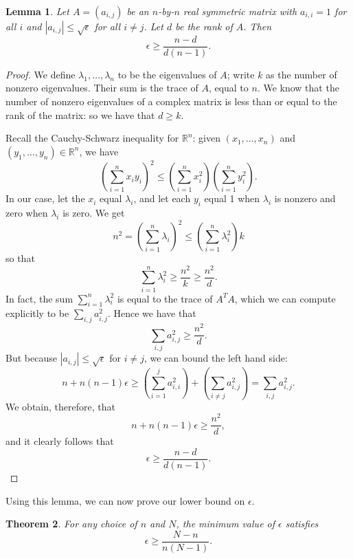 \documentclass[11pt,letterpaper,twoside,english]{article}
\theoremstyle{theorem}
\newtheorem{theorem}{Theorem}[section]
\newtheorem{lemma}[theorem]{Lemma}
\theoremstyle{remark}
\begin{document}
\begin{lemma}
Let $A=(a_{i,j})$ be an $n$-by-$n$ real symmetric matrix with $a_{i,i}=1$ for all $i$ and $|a_{i,j}|\leq \sqrt{\epsilon}$ for all $i\neq j$. Let $d$ be the rank of $A$. Then
\[\epsilon\geq \frac{n-d}{d(n-1)}.\]
\end{lemma}
\begin{proof}
We define $\lambda_1,\ldots, \lambda_n$ to be the eigenvalues of $A$; write $k$ as the number of nonzero eigenvalues. Their sum is the trace of $A$, equal to $n$. We know that the number of nonzero eigenvalues of a complex matrix is less than or equal to the rank of the matrix: so we have that $d\geq k$.

Recall the Cauchy-Schwarz inequality for $\mathbb R^n$: given $(x_1,\ldots, x_n)$ and $(y_1,\ldots, y_n)\in \mathbb R^n$, we have
\[\left(\sum_{i=1}^nx_iy_i\right)^2\leq \left(\sum_{i=1}^n x_i^2\right)\left(\sum_{i=1}^ny_i^2\right).\]
In our case, let the $x_i$ equal $\lambda_i$, and let each $y_i$ equal 1 when $\lambda_i$ is nonzero and zero when $\lambda_i$ is zero. We get
\[n^2=\left(\sum_{i=1}^n \lambda_i\right)^2\leq \left(\sum_{i=1}^n \lambda_i^2\right) k\]
so that
\[\sum_{i=1}^n \lambda_i^2\geq\frac{n^2}{k}\geq \frac{n^2}{d}.\]
In fact, the sum $\sum_{i=1}^n \lambda_i^2$ is equal to the trace of $A^TA$, which we can compute explicitly to be $\sum_{i,j}a_{i,j}^2$. Hence we have that
\[\sum_{i,j}a_{i,j}^2\geq \frac{n^2}{d}.\]
But because $|a_{i,j}|\leq \sqrt\epsilon$ for $i\neq j$, we can bound the left hand side:
\[n+n(n-1)\epsilon\geq \left(\sum_{i=1}^j a_{i,i}^2\right)+\left(\sum_{i\neq j}a_{i,j}^2\right)=\sum_{i,j}a_{i,j}^2.\]
We obtain, therefore, that
\[n+n(n-1)\epsilon\geq \frac{n^2}{d},\]
and it clearly follows that
\[\epsilon\geq \frac{n-d}{d(n-1)}.\]
\end{proof}
Using this lemma, we can now prove our lower bound on $\epsilon$.
\begin{theorem}
\label{lower_bound}
For any choice of $n$ and $N$, the minimum value of $\epsilon$ satisfies
\[\epsilon\geq \frac{N-n}{n(N-1)}.\]
\end{theorem}
\end{document}
